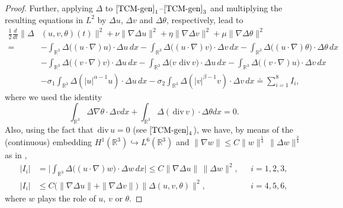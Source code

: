 \documentclass[a4paper]{article}
\newcommand{\dx}{\, dx}
\newcommand{\R}{\mathbb{R}}
\providecommand{\dv}{\,\mathrm{div}\,}
\begin{document}
\begin{proof}
  Further, applying $\Delta$ to $\eqref{TCM-gen}_1$--$\eqref{TCM-gen}_3$ and multiplying
  the resulting equations in $L^2$ by $\Delta u$, $\Delta v$ and
  $\Delta \theta$, respectively, lead to
%
  \begin{equation} \label{Hs-stima-diff-iniziale}
    \begin{aligned}
      \frac{1}{2} \frac{d}{dt} \|\Delta & (u, v, \theta) (t) \|^2
      + \nu\|\nabla \Delta u\|^2 + \eta \|\nabla \Delta v\|^2 + \mu
      \|\nabla \Delta \theta\|^2
      \\
      = & -\int_{\R^3}\Delta \big( (u\cdot \nabla) u\big) \cdot \Delta
      u \dx - \int_{\R^3}\Delta \big( (u\cdot \nabla) v\big) \cdot
      \Delta v \dx - \int_{\R^3}\Delta\big( (u \cdot \nabla)
      \theta\big) \cdot \Delta\theta \dx
      \\
      &-\int_{\R^3}\Delta\big( (v\cdot \nabla) v\big) \cdot \Delta u
      \dx - \int_{\R^3}\Delta\big( v \,\dv v\big)\cdot \Delta u \dx -
      \int_{\R^3}\Delta\big( (v\cdot \nabla) u\big) \cdot \Delta v \dx
      \\
      & - \sigma_1\int_{\R^3}\Delta(|u|^{\alpha-1}u)\cdot \Delta u
      \dx- \sigma_2\int_{\R^3}\Delta(|v|^{\beta-1}v)\cdot \Delta v \dx
      \doteq \sum_{i=1}^8 I_i,
    \end{aligned}
  \end{equation}
%
where we used the identity
%
  \begin{equation*} %
    \int_{\R^3}\Delta \nabla \theta\cdot \Delta v dx
    + \int_{\R^3}\Delta(\dv v)\cdot \Delta \theta dx =0.
  \end{equation*}
%
  Also, using the fact that $\dv u =0$ (see $\eqref{TCM-gen}_4$), we have, by means of the (continuous) embedding
  $H^1(\mathbb{R}^3)\hookrightarrow L^6(\mathbb{R}^3)$ and
  $\|\nabla w\|\le C\|w\|^{\frac14}\,\|\Delta w\|^{\frac34}$ as in
  \cite{Ma-Jiang-Wan},
  \begin{equation*}
  \label{e:I-no-dampings}
    \begin{aligned}
      |I_i| &= \Big|\int_{\mathbb{R}^3} \Delta \big( (u\cdot \nabla)
      w\big) \cdot \Delta w \dx \Big| \leq C \|\nabla \Delta
      u\|\,\|\Delta w\|^2, \,\,\,\, &i=1,2,3,
      \\
      |I_i|&\leq C\big(\|\nabla \Delta u\| + \|\nabla \Delta
      v\|\big)\,\|\Delta (u,v,\theta)\|^2, \,\,\,\, &i=4,5,6,
    \end{aligned}
  \end{equation*}
   where   $w$ plays the role of $u$, $v$ or $\theta$.
    

\end{proof}
\end{document}
